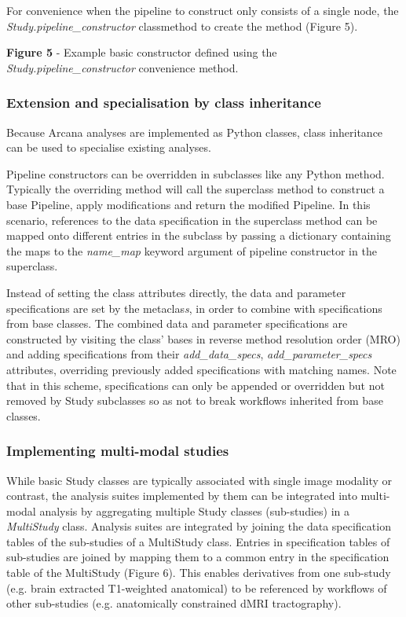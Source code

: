 For convenience when the pipeline to construct only consists of a single
node, the \emph{Study.pipeline\_constructor} classmethod to create the
method (Figure 5).


\textbf{Figure 5} - Example basic constructor defined using the
\emph{Study.pipeline\_constructor} convenience method.

\subsubsection{Extension and specialisation by class inheritance}
\label{extension-and-specialisation-by-class-inheritance}

Because Arcana analyses are implemented as Python classes, class
inheritance can be used to specialise existing analyses.

Pipeline constructors can be overridden in subclasses like any Python
method. Typically the overriding method will call the superclass method
to construct a base Pipeline, apply modifications and return the
modified Pipeline. In this scenario, references to the data
specification in the superclass method can be mapped onto different
entries in the subclass by passing a dictionary containing the maps to
the \emph{name\_map} keyword argument of pipeline constructor in the
superclass.

Instead of setting the class attributes directly, the data and parameter
specifications are set by the metaclas\emph{s}, in order to combine with
specifications from base classes. The combined data and parameter
specifications are constructed by visiting the class' bases in reverse
method resolution order (MRO) and adding specifications from their
\emph{add\_data\_specs}, \emph{add\_parameter\_specs} attributes,
overriding previously added specifications with matching names. Note
that in this scheme, specifications can only be appended or overridden
but not removed by Study subclasses so as not to break workflows
inherited from base classes.

\subsubsection{Implementing multi-modal
studies}
\label{implementing-multi-modal-studies}

While basic Study classes are typically associated with single image
modality or contrast, the analysis suites implemented by them can be
integrated into multi-modal analysis by aggregating multiple Study
classes (sub-studies) in a \emph{MultiStudy} class. Analysis suites are
integrated by joining the data specification tables of the sub-studies
of a MultiStudy class. Entries in specification tables of sub-studies
are joined by mapping them to a common entry in the specification table
of the MultiStudy (Figure 6). This enables derivatives from one
sub-study (e.g. brain extracted T1-weighted anatomical) to be referenced
by workflows of other sub-studies (e.g. anatomically constrained dMRI
tractography).

